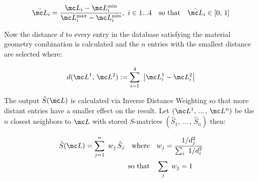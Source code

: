 \begin{equation}
    \bar{\mc L}_i = \frac{\mc L_i - \mc L_i^\s{min}}{\mc L_i^\s{max} - \mc L_i^\s{min}}
    , \  i \in 1 ... 4
    \qq{so that} \bar{\mc L}_i \in [0, \, 1]
\end{equation}

\noindent
Now the distance $d$ to every entry in the database satisfying the material geometry combination is calculated and the $n$ entries with the smallest distance are selected where:

\begin{equation}
    d(\mc L^1, \, \mc L^2) := \sum_{i=1}^4 \ \qty|\mc L^1_i - \mc L^2_i|
\end{equation}

\noindent
The output $\hat{S}(\mc L)$ is calculated via Inverse Distance Weighting \cite{Shepard1968} so that more distant entries have a smaller effect on the result. Let
$(\mc L^1, \, ... \, , \, \mc L^n)$ be the $n$ closest neighbors to $\mc L$ with stored $S$-matrices
$(\hat{S}_1, \, ... \, , \, \hat{S}_n)$
then:

\begin{equation}
\begin{aligned}
    \hat{S}(\mc L) = \sum_{j=1}^n \ w_j \, \hat{S}_j
    \qq{where}& w_j = \frac{1 / d_j^2}{\sum_i \ 1 / d^2_i} \\
    \qq*{so that} &\sum_j \ w_j = 1
\end{aligned}
\end{equation}